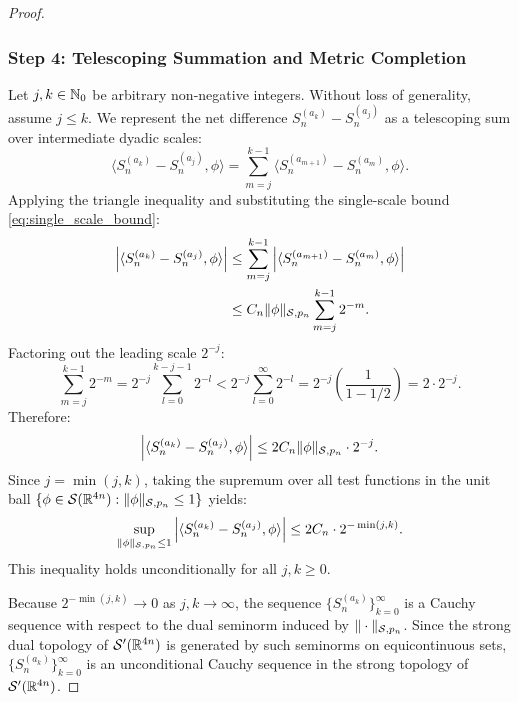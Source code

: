 \begin{proof}
\subsubsection*{Step 4: Telescoping Summation and Metric Completion}
Let $j, k \in \mathbb{N}_0$ be arbitrary non-negative integers. Without loss of generality, assume $j \le k$. We represent the net difference $S_n^{(a_k)} - S_n^{(a_j)}$ as a telescoping sum over intermediate dyadic scales:
\begin{equation}
\label{eq:telescoping_sum}
\langle S_n^{(a_k)} - S_n^{(a_j)}, \phi \rangle = \sum_{m = j}^{k - 1} \langle S_n^{(a_{m+1})} - S_n^{(a_m)}, \phi \rangle.
\end{equation}
Applying the triangle inequality and substituting the single-scale bound \eqref{eq:single_scale_bound}:
\begin{align}
\left| \langle S_n^{(a_k)} - S_n^{(a_j)}, \phi \rangle \right| 
&\le \sum_{m = j}^{k - 1} \left| \langle S_n^{(a_{m+1})} - S_n^{(a_m)}, \phi \rangle \right| \nonumber \\
&\le C_n \|\phi\|_{\mathcal{S}, p_n} \sum_{m = j}^{k - 1} 2^{-m}.
\end{align}
Factoring out the leading scale $2^{-j}$:
\begin{equation}
\sum_{m = j}^{k - 1} 2^{-m} = 2^{-j} \sum_{l = 0}^{k - j - 1} 2^{-l} < 2^{-j} \sum_{l = 0}^\infty 2^{-l} = 2^{-j} \left( \frac{1}{1 - 1/2} \right) = 2 \cdot 2^{-j}.
\end{equation}
Therefore:
\begin{equation}
\left| \langle S_n^{(a_k)} - S_n^{(a_j)}, \phi \rangle \right| \le 2 C_n \|\phi\|_{\mathcal{S}, p_n} \cdot 2^{-j}.
\end{equation}
Since $j = \min(j, k)$, taking the supremum over all test functions in the unit ball $\{\phi \in \mathcal{S}(\mathbb{R}^{4n}) : \|\phi\|_{\mathcal{S}, p_n} \le 1\}$ yields:
\begin{equation}
\sup_{\|\phi\|_{\mathcal{S}, p_n} \le 1} \left| \langle S_n^{(a_k)} - S_n^{(a_j)}, \phi \rangle \right| \le 2 C_n \cdot 2^{-\min(j, k)}.
\end{equation}
This inequality holds unconditionally for all $j, k \ge 0$.

Because $2^{-\min(j, k)} \to 0$ as $j, k \to \infty$, the sequence $\{S_n^{(a_k)}\}_{k=0}^\infty$ is a Cauchy sequence with respect to the dual seminorm induced by $\|\cdot\|_{\mathcal{S}, p_n}$. Since the strong dual topology of $\mathcal{S}'(\mathbb{R}^{4n})$ is generated by such seminorms on equicontinuous sets, $\{S_n^{(a_k)}\}_{k=0}^\infty$ is an unconditional Cauchy sequence in the strong topology of $\mathcal{S}'(\mathbb{R}^{4n})$.
\end{proof}

